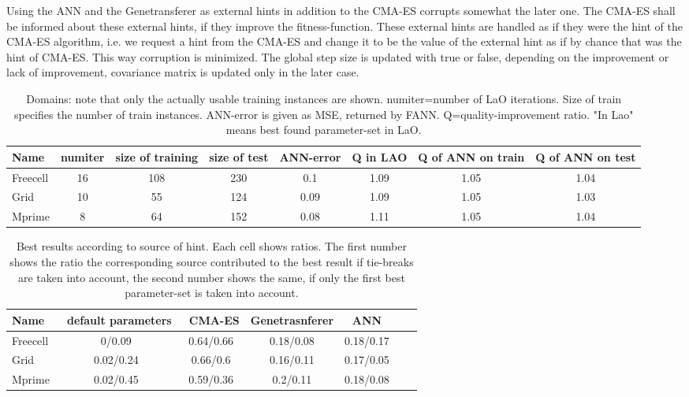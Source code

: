 \documentclass{acm_proc_article-sp}
\begin{document}
Using the ANN and the Genetransferer as external hints in addition to the CMA-ES corrupts somewhat the later one. The CMA-ES shall be informed about these external hints, if they improve the fitness-function. These external hints are handled as if they were the hint of the CMA-ES algorithm, i.e. we request a hint from the CMA-ES and change it to be the value of the external hint as if by chance that was the hint of CMA-ES. This way corruption is minimized. The global step size is updated with true or false, depending on the improvement or lack of improvement, covariance matrix is updated only in the later case.

\begin{table*}[ht]
\centering
\begin{tabular}{l c c c c c c c}
\hline\hline
Name & numiter & size of training & size of test &  ANN-error & Q in LAO & Q of ANN on train & Q of ANN on test \\ 
\hline
Freecell& 16 & 108 & 230 & 0.1 & 1.09 & 1.05 & 1.04  \\
Grid & 10 & 55 & 124 & 0.09 & 1.09 & 1.05 & 1.03  \\
Mprime & 8 & 64 & 152 & 0.08 & 1.11 & 1.05 & 1.04   \\
\hline
\end{tabular}
\caption{Domains: note that only the actually usable training instances are shown. numiter=number of LaO iterations. Size of train specifies the number of train instances. ANN-error is given as MSE, returned by FANN. Q=quality-improvement ratio. "In Lao" means best found parameter-set in LaO.}
\label{table:domains}
\end{table*} 

 \begin{table*}[ht]
\centering
\begin{tabular}{l c c c c c c}
\hline\hline
Name & \ default parameters & \ CMA-ES &  Genetrasnferer & ANN \\ 
\hline
Freecell & 0/0.09& 0.64/0.66  & 0.18/0.08  & 0.18/0.17     \\
Grid & 0.02/0.24 & 0.66/0.6  & 0.16/0.11 & 0.17/0.05  &    \\
Mprime &  0.02/0.45& 0.59/0.36 & 0.2/0.11  & 0.18/0.08  &    \\
\hline
\end{tabular}
\caption{Best results according to source of hint. Each cell shows ratios. The first number shows the ratio the corresponding source contributed to the best result if tie-breaks are taken into account, the second number shows the same, if only the first best parameter-set is taken into account.}
\label{table:hints}
\end{table*} 
\end{document}
